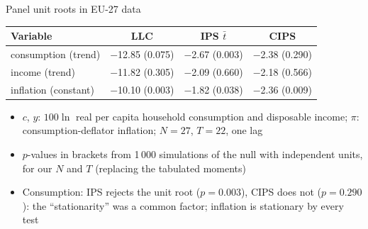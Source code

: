 \begin{frame}{Panel unit roots in EU-27 data}
\itemsize{\small}
\begin{center}
\footnotesize
\begin{tabular}{lccc}
\toprule
\textbf{Variable} & LLC & IPS $\bar t$ & CIPS \\
\midrule
consumption (trend) & \ensuremath{-}12.85 (0.075) & \ensuremath{-}2.67 (0.003) & \ensuremath{-}2.38 (0.290) \\
income (trend) & \ensuremath{-}11.82 (0.305) & \ensuremath{-}2.09 (0.660) & \ensuremath{-}2.18 (0.566) \\
inflation (constant) & \ensuremath{-}10.10 (0.003) & \ensuremath{-}1.82 (0.038) & \ensuremath{-}2.36 (0.009) \\
\bottomrule
\end{tabular}
\end{center}
\begin{itemize}
    \item $c$, $y$: $100\ln$ real per capita household consumption and disposable income; $\pi$: consumption-deflator inflation; $N = 27$, $T = 22$, one lag
    \item $p$-values in brackets from 1\,000 simulations of the null with independent units, for our $N$ and $T$ (replacing the tabulated moments)
    \item Consumption: IPS rejects the unit root ($p = 0.003$), CIPS does not ($p = 0.290$): the ``stationarity'' was a common factor; inflation is stationary by every test
\end{itemize}
\end{frame}

